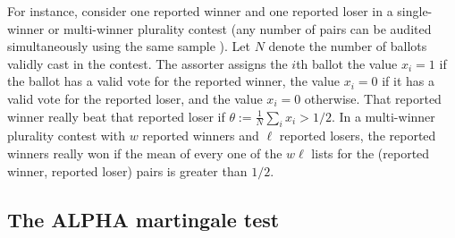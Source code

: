 \documentclass[12pt,runningheads]{llncs}
\begin{document}
{For instance, consider one reported winner and one reported loser in a single-winner or multi-winner plurality 
contest (any number of pairs can
be audited simultaneously using the same sample \cite{stark20}).
Let $N$ denote the number of ballots validly cast in the contest.
The assorter assigns the $i$th ballot the value $x_i=1$ if the ballot has a valid vote for the reported winner, 
the value $x_i=0$ if it has a valid vote for the reported loser, and the value $x_i=0$ otherwise.
That reported winner really beat that reported loser if $\theta := \frac{1}{N}\sum_i x_i > 1/2$.
In a multi-winner plurality contest with $w$ reported winners and $\ell$ reported losers,
the reported winners really won if the mean of every one of the $w\ell$ lists for the (reported winner, reported loser) pairs
is greater than $1/2$.

\subsection{The ALPHA martingale test}

}
\end{document}
